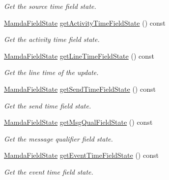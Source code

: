 \begin{CompactItemize}
\begin{CompactList}\small\item\em Get the source time field state. \item\end{CompactList}\item 
\hyperlink{namespaceWombat_93aac974f2ab713554fd12a1fa3b7d2a}{Mamda\-Field\-State} \hyperlink{classWombat_1_1MamdaSecStatusListener_5c7ee86111027d782bc1477700a78224}{get\-Activity\-Time\-Field\-State} () const 
\begin{CompactList}\small\item\em Get the activity time field state. \item\end{CompactList}\item 
\hyperlink{namespaceWombat_93aac974f2ab713554fd12a1fa3b7d2a}{Mamda\-Field\-State} \hyperlink{classWombat_1_1MamdaSecStatusListener_3772a00bb836461eb5dac1a57631b000}{get\-Line\-Time\-Field\-State} () const 
\begin{CompactList}\small\item\em Get the line time of the update. \item\end{CompactList}\item 
\hyperlink{namespaceWombat_93aac974f2ab713554fd12a1fa3b7d2a}{Mamda\-Field\-State} \hyperlink{classWombat_1_1MamdaSecStatusListener_dce997a03b809f9d8f3adc1f1cce3d82}{get\-Send\-Time\-Field\-State} () const 
\begin{CompactList}\small\item\em Get the send time field state. \item\end{CompactList}\item 
\hyperlink{namespaceWombat_93aac974f2ab713554fd12a1fa3b7d2a}{Mamda\-Field\-State} \hyperlink{classWombat_1_1MamdaSecStatusListener_8765ba6f3282f63dec55b258a6c42836}{get\-Msg\-Qual\-Field\-State} () const 
\begin{CompactList}\small\item\em Get the message qualifier field state. \item\end{CompactList}\item 
\hyperlink{namespaceWombat_93aac974f2ab713554fd12a1fa3b7d2a}{Mamda\-Field\-State} \hyperlink{classWombat_1_1MamdaSecStatusListener_facf6d5f611fb76e7e3e1e181f0b0d89}{get\-Event\-Time\-Field\-State} () const 
\begin{CompactList}\small\item\em Get the event time field state. \item\end{CompactList}\item 

\end{CompactItemize}
